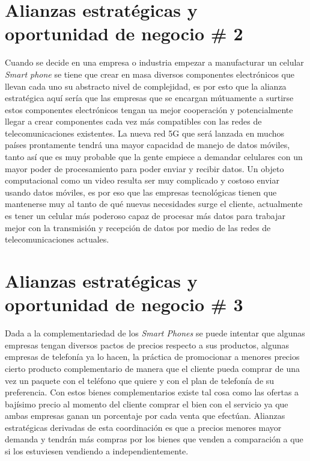 \documentclass{article}
\begin{document}

\section{Alianzas estratégicas y oportunidad de negocio \# 2}
Cuando se decide en una empresa o industria empezar a manufacturar un celular \emph{Smart phone} se tiene que crear en masa diversos componentes electrónicos que llevan cada uno su abstracto nivel de complejidad, es por esto que la alianza estratégica aquí sería que las empresas que se encargan mútuamente a surtirse estos componentes electrónicos tengan ua mejor cooperación y potencialmente llegar a crear componentes cada vez más compatibles con las redes de telecomunicaciones existentes. La nueva red 5G que será lanzada en muchos países prontamente tendrá una mayor capacidad de manejo de datos móviles, tanto así que es muy probable que la gente empiece a demandar celulares con un mayor poder de procesamiento para poder enviar y recibir datos. Un objeto computacional como un video resulta ser muy complicado y costoso enviar usando datos móviles, es por eso que las empresas tecnológicas tienen que mantenerse muy al tanto de qué nuevas necesidades surge el cliente, actualmente es tener un celular más poderoso capaz de procesar más datos para trabajar mejor con la transmisión y recepción de datos por medio de las redes de telecomunicaciones actuales.



\section{Alianzas estratégicas y oportunidad de negocio \# 3}
Dada a la complementariedad de los \emph{Smart Phones} se puede intentar que algunas empresas tengan diversos pactos de precios respecto a sus productos, algunas empresas de telefonía ya lo hacen, la práctica de promocionar a menores precios cierto producto complementario de manera que el cliente pueda comprar de una vez un paquete con el teléfono que quiere y con el plan de telefonía de su preferencia. Con estos bienes complementarios existe tal cosa como las ofertas a bajísimo precio al momento del cliente comprar el bien con el servicio ya que ambas empresas ganan un porcentaje por cada venta que efectúan. Alianzas estratégicas derivadas de esta coordinación es que a precios menores mayor demanda y tendrán más compras por los bienes que venden a comparación a que si los estuviesen vendiendo a independientemente.
\end{document}
